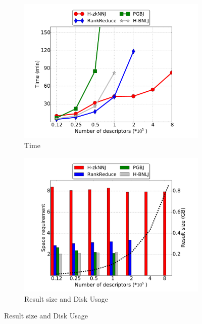 \documentclass[10pt,journal,compsoc]{IEEEtran}
\begin{document}
%


\begin{figure}[htp]
	\centering
	\begin{subfigure}[b]{0.35\textwidth}
		\includegraphics[width=\textwidth]{img-perf/surf/data/time.pdf}
		\caption{Time\label{fig:surf_data_time}}    
	\end{subfigure}%
	\begin{subfigure}[b]{0.35\textwidth}
		\includegraphics[width=\textwidth]{img-perf/surf/data/memory.pdf}
		\caption{Result size and Disk Usage\label{fig:surf_data_memory}}
	\end{subfigure}%

\end{figure}
\end{document}
